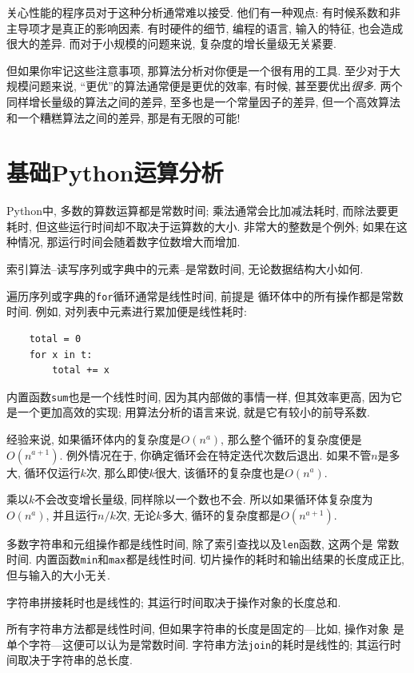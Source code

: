 \documentclass[10pt]{book}
\begin{document}
关心性能的程序员对于这种分析通常难以接受.
他们有一种观点: 有时候系数和非主导项才是真正的影响因素. 
有时硬件的细节, 编程的语言, 输入的特征, 也会造成很大的差异. 
而对于小规模的问题来说, 复杂度的增长量级无关紧要. 

但如果你牢记这些注意事项, 那算法分析对你便是一个很有用的工具. 
至少对于大规模问题来说, ``更优''的算法通常便是更优的效率, 有时候, 
甚至要优出{\em 很多}. 
两个同样增长量级的算法之间的差异, 至多也是一个常量因子的差异, 
但一个高效算法和一个糟糕算法之间的差异, 那是有无限的可能!


\section{基础Python运算分析}

Python中, 多数的算数运算都是常数时间;
乘法通常会比加减法耗时, 而除法要更耗时, 
但这些运行时间却不取决于运算数的大小. 
非常大的整数是个例外; 如果在这种情况, 那运行时间会随着数字位数增大而增加. 

索引算法--读写序列或字典中的元素--是常数时间, 无论数据结构大小如何. 

遍历序列或字典的{\tt for}循环通常是线性时间, 前提是
循环体中的所有操作都是常数时间. 
例如, 对列表中元素进行累加便是线性耗时:

\begin{verbatim}
    total = 0
    for x in t:
        total += x
\end{verbatim}

内置函数{\tt sum}也是一个线性时间, 因为其内部做的事情一样, 
但其效率更高, 因为它是一个更加高效的实现; 用算法分析的语言来说, 
就是它有较小的前导系数.

经验来说, 如果循环体内的复杂度是$O(n^a)$, 那么整个循环的复杂度便是
$O(n^{a+1})$. 
例外情况在于, 你确定循环会在特定迭代次数后退出. 
如果不管$n$是多大, 循环仅运行$k$次, 
那么即使$k$很大, 该循环的复杂度也是$O(n^a)$.

乘以$k$不会改变增长量级, 同样除以一个数也不会. 
所以如果循环体复杂度为 $O(n^a)$, 并且运行$n/k$次, 无论$k$多大, 
循环的复杂度都是$O(n^{a+1})$. 

多数字符串和元组操作都是线性时间, 除了索引查找以及{\tt len}函数, 这两个是
常数时间. 内置函数{\tt min}和{\tt max}都是线性时间. 
切片操作的耗时和输出结果的长度成正比, 但与输入的大小无关. 

字符串拼接耗时也是线性的; 其运行时间取决于操作对象的长度总和. 

所有字符串方法都是线性时间, 但如果字符串的长度是固定的---比如, 操作对象
是单个字符---这便可以认为是常数时间.
字符串方法{\tt join}的耗时是线性的; 其运行时间取决于字符串的总长度. 
\end{document}
